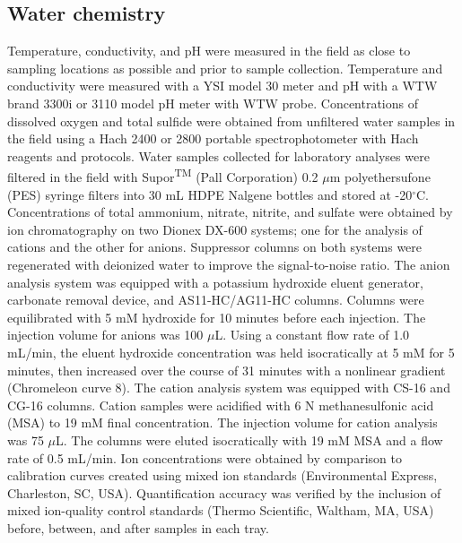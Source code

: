 \subsection{Water chemistry} Temperature, conductivity, and pH were measured in the field as close to sampling locations as possible and prior to sample collection. Temperature and conductivity were measured with a YSI model 30 meter and pH with a WTW brand 3300i or 3110 model pH meter with WTW probe. Concentrations of dissolved oxygen and total sulfide were obtained from unfiltered water samples in the field using a Hach 2400 or 2800 portable spectrophotometer with Hach reagents and protocols. Water samples collected for laboratory analyses were filtered in the field with Supor\textsuperscript{TM} (Pall Corporation) 0.2 $\mu$m polyethersufone (PES) syringe filters into 30 mL HDPE Nalgene bottles and stored at -20$^{\circ}$C. Concentrations of total ammonium, nitrate, nitrite, and sulfate were obtained by ion chromatography on two Dionex DX-600 systems; one for the analysis of cations and the other for anions. Suppressor columns on both systems were regenerated with deionized water to improve the signal-to-noise ratio. The anion analysis system was equipped with a potassium hydroxide eluent generator, carbonate removal device, and AS11-HC/AG11-HC columns. Columns were equilibrated with 5 mM hydroxide for 10 minutes before each injection. The injection volume for anions was 100 $\mu$L. Using a constant flow rate of 1.0 mL/min, the eluent hydroxide concentration was held isocratically at 5 mM for 5 minutes, then increased over the course of 31 minutes with a nonlinear gradient (Chromeleon curve 8). The cation analysis system was equipped with CS-16 and CG-16 columns. Cation samples were acidified with 6 N methanesulfonic acid (MSA) to 19 mM final concentration. The injection volume for cation analysis was 75 $\mu$L. The columns were eluted isocratically with 19 mM MSA and a flow rate of 0.5 mL/min. Ion concentrations were obtained by comparison to calibration curves created using mixed ion standards (Environmental Express, Charleston, SC, USA). Quantification accuracy was verified by the inclusion of mixed ion-quality control standards (Thermo Scientific, Waltham, MA, USA) before, between, and after samples in each tray.

